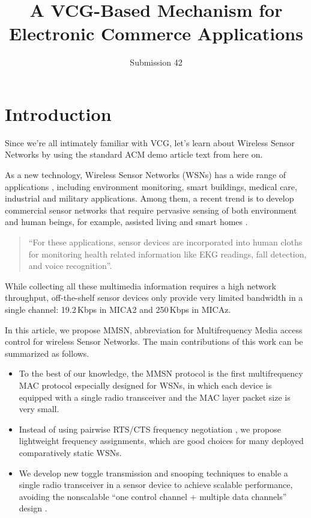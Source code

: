 \documentclass[format=acmsmall, review=false]{acmart}
\title[A VCG-Based Mechanism for Electronic Commerce]{A VCG-Based Mechanism for Electronic Commerce Applications}
\author{Submission 42}
\begin{document}
\maketitle


\section{Introduction}

Since we're all intimately familiar with VCG, let's learn about Wireless Sensor Networks by using the standard ACM demo article text from here on.

As a new technology, Wireless Sensor Networks (WSNs) has a wide
range of applications \cite{Culler-01, Bahl-02, Akyildiz-01}, including
environment monitoring, smart buildings, medical care, industrial and
military applications. Among them, a recent trend is to develop
commercial sensor networks that require pervasive sensing of both
environment and human beings, for example, assisted living
\cite{Akyildiz-02, Harvard-01,CROSSBOW} and smart homes
\cite{Harvard-01, Adya-01,CROSSBOW}.
\begin{quote}
	``For these applications, sensor devices are incorporated into human
	cloths \cite{Natarajan-01, Zhou-06, Bahl-02, Adya-01} for monitoring
	health related information like EKG readings, fall detection, and
	voice recognition''.
\end{quote}
While collecting all these multimedia information
\cite{Akyildiz-02} requires a high network throughput, off-the-shelf
sensor devices only provide very limited bandwidth in a single
channel: 19.2\,Kbps in MICA2 \cite{Bahl-02} and 250\,Kbps in MICAz.

In this article, we propose MMSN, abbreviation for Multifrequency
Media access control for wireless Sensor Networks. The main
contributions of this work can be summarized as follows.
\begin{itemize}
	\item To the best of our knowledge, the MMSN protocol is the first
	multifrequency MAC protocol especially designed for WSNs, in which
	each device is equipped with a single radio transceiver and
	the MAC layer packet size is very small.
	\item Instead of using pairwise RTS/CTS frequency negotiation
	\cite{Adya-01, Culler-01, Tzamaloukas-01, Zhou-06},
	we propose lightweight frequency assignments, which are good choices
	for many deployed comparatively static WSNs.
	\item We develop new toggle transmission and snooping techniques to
	enable a single radio transceiver in a sensor device to achieve
	scalable performance, avoiding the nonscalable ``one
	control channel + multiple data channels'' design \cite{Natarajan-01}.
\end{itemize}
\end{document}
